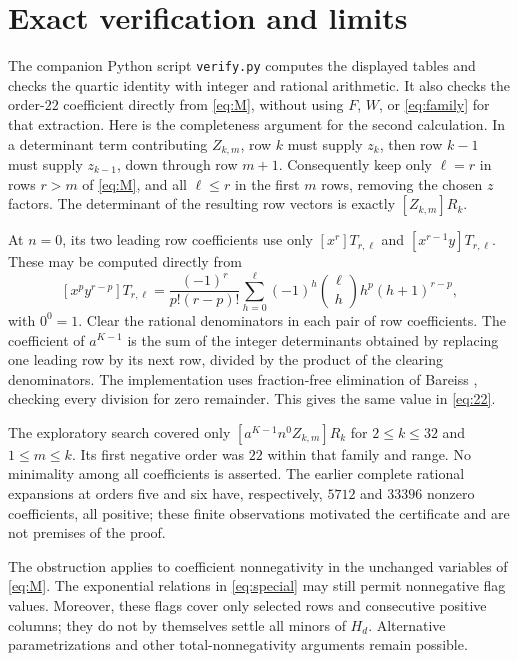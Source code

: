 \documentclass[11pt]{article}
\newcommand{\coef}[1]{\left[#1\right]}
\begin{document}
\section{Exact verification and limits}

The companion Python script \texttt{verify.py} computes the displayed
tables and checks the quartic identity with integer and rational
arithmetic. It also checks the order-$22$ coefficient directly from
\eqref{eq:M}, without using $F$, $W$, or \eqref{eq:family} for that
extraction. Here is the completeness argument for the second calculation.
In a determinant term contributing $Z_{k,m}$, row $k$ must supply $z_k$,
then row $k-1$ must supply $z_{k-1}$, down through row $m+1$.
Consequently keep only $\ell=r$ in rows $r>m$ of \eqref{eq:M}, and all
$\ell\leq r$ in the first $m$ rows, removing the chosen $z$ factors.
The determinant of the resulting row vectors is exactly
$\coef{Z_{k,m}}R_k$.

At $n=0$, its two leading row coefficients use only
$\coef{x^r}T_{r,\ell}$ and $\coef{x^{r-1}y}T_{r,\ell}$. These may be
computed directly from
\begin{equation}\label{eq:powersum}
 \coef{x^py^{r-p}}T_{r,\ell}
 =\frac{(-1)^r}{p!(r-p)!}
 \sum_{h=0}^{\ell}(-1)^h\binom{\ell}{h}h^p(h+1)^{r-p},
\end{equation}
with $0^0=1$. Clear the rational denominators in each pair of row
coefficients. The coefficient of $a^{K-1}$ is the sum of the integer
determinants obtained by replacing one leading row by its next row,
divided by the product of the clearing denominators. The implementation
uses fraction-free elimination of Bareiss \cite[Section~I]{Bareiss1968},
checking every division for zero remainder. This gives the same value
in \eqref{eq:22}.

The exploratory search covered only
$\coef{a^{K-1}n^0Z_{k,m}}R_k$ for $2\leq k\leq32$ and
$1\leq m\leq k$. Its first negative order was $22$ within that family
and range. No minimality among all coefficients is asserted. The earlier
complete rational expansions at orders five and six have, respectively,
$5712$ and $33396$ nonzero coefficients, all positive; these finite
observations motivated the certificate and are not premises of the proof.

The obstruction applies to coefficient nonnegativity in the unchanged
variables of \eqref{eq:M}. The exponential relations in
\eqref{eq:special} may still permit nonnegative flag values. Moreover,
these flags cover only selected rows and consecutive positive columns;
they do not by themselves settle all minors of $H_d$. Alternative
parametrizations and other total-nonnegativity arguments remain possible.
\end{document}
